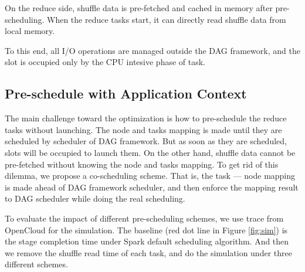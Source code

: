 On the reduce side, shuffle data is pre-fetched and cached in memory after pre-scheduling. When the reduce tasks start, it can directly read shuffle data from local memory.

To this end, all I/O operations are managed outside the DAG framework, and the slot is occupied only by the CPU intesive phase of task.

\subsection{Pre-schedule with Application Context}
The main challenge toward the optimization is how to pre-schedule the reduce tasks without launching. The node and tasks mapping is made until they are scheduled by scheduler of DAG framework. But as soon as they are scheduled, slots will be occupied to launch them.  On the other hand, shuffle data cannot be pre-fetched without knowing the node and tasks mapping. 
To get rid of this dilemma, we propose a co-scheduling scheme. That is, the task --- node mapping is made ahead of DAG framework scheduler, and then enforce the mapping result to DAG scheduler while doing the real scheduling. 

To evaluate the impact of different pre-scheduling schemes, we use trace from OpenCloud\cite{opencloudtrace} for the simulation. The baseline (red dot line in Figure \ref{fig:sim}) is the stage completion time under Spark default scheduling algorithm. And then we remove the shuffle read time of each task, and do the simulation under three different schemes.

